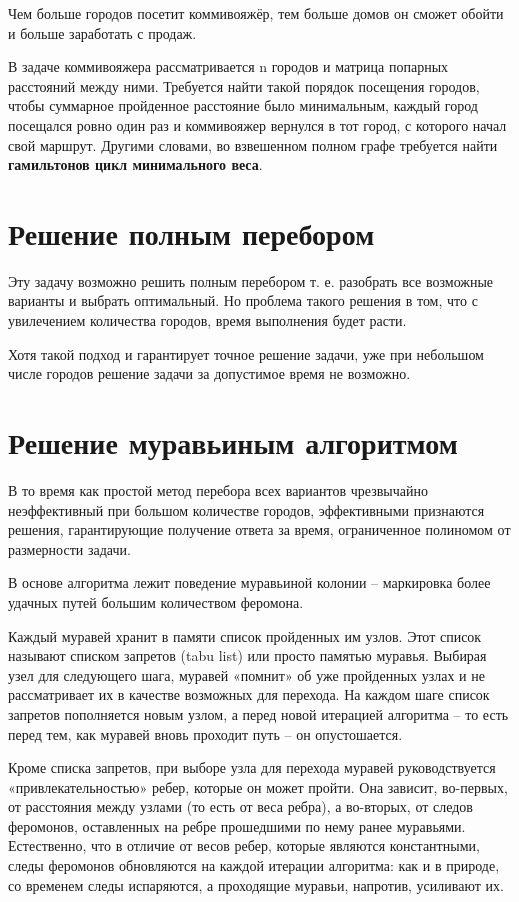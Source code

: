 \documentclass[12pt,a4paper]{report}
\begin{document}
Чем больше городов посетит коммивояжёр, тем больше домов он сможет обойти и больше заработать с продаж.

В задаче коммивояжера рассматривается n городов и матрица
попарных расстояний между ними. Требуется найти такой порядок  посещения  городов,  чтобы  суммарное  пройденное  расстояние было минимальным, каждый город посещался ровно один раз 
и  коммивояжер  вернулся  в  тот  город,  с  которого  начал  свой  маршрут.  Другими  словами,  во  взвешенном  полном  графе  требуется найти \textbf{гамильтонов цикл минимального веса}.



\section{Решение полным перебором}

Эту задачу возможно решить полным перебором т. е. разобрать все возможные варианты и выбрать оптимальный. Но проблема такого решения в том, что с увилечением количества городов, время выполнения будет расти.

Хотя такой подход и гарантирует точное решение задачи, уже при небольшом числе городов решение задачи за допустимое время не возможно.


\section{Решение муравьиным алгоритмом}

В то время как простой метод перебора всех вариантов чрезвычайно
неэффективный при большом количестве городов,
эффективными признаются решения, гарантирующие получение
ответа за время, ограниченное полиномом от размерности задачи.

В основе алгоритма лежит поведение муравьиной колонии -- маркировка более удачных
путей большим количеством феромона.

Каждый муравей хранит в памяти список пройденных им узлов. Этот список называют списком запретов (tabu list) или просто памятью муравья. Выбирая узел для следующего шага, муравей «помнит» об уже пройденных узлах и не рассматривает их в качестве возможных для перехода. На каждом шаге список запретов пополняется новым узлом, а перед новой итерацией алгоритма – то есть перед тем, как муравей вновь проходит путь – он опустошается.

Кроме списка запретов, при выборе узла для перехода муравей руководствуется «привлекательностью» ребер, которые он может пройти. Она зависит, во-первых, от расстояния между узлами (то есть от веса ребра), а во-вторых, от следов феромонов, оставленных на ребре прошедшими по нему ранее муравьями. Естественно, что в отличие от весов ребер, которые являются константными, следы феромонов обновляются на каждой итерации алгоритма: как и в природе, со временем следы испаряются, а проходящие муравьи, напротив, усиливают их.
\end{document}
